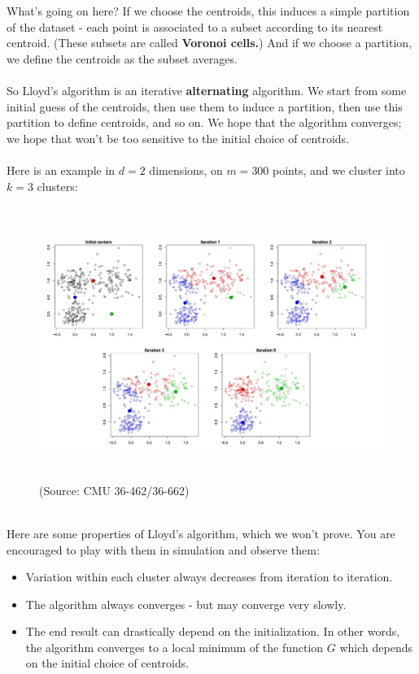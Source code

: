 What's going on here? 
If we choose the centroids, this induces a simple partition of the dataset -
each point is associated to a subset according to its nearest centroid. (These
  subsets are 
called {\bf Voronoi cells.}) And if we choose a partition, we define the
centroids as the subset averages. 
\\~\\
So Lloyd's algorithm is an iterative {\bf alternating} algorithm. 
We start from some initial
guess of the centroids, then use them to induce a partition, then use this
partition to define centroids, and so on. We hope that the algorithm converges;
we hope that won't be too sensitive to the initial choice of centroids.
\\~\\
Here is an example in  $d=2$ dimensions, on $m=300$ points, and we cluster into
$k=3$ clusters: 
\begin{figure}[H]
      \centering
      \includegraphics[height=3.5in]{kmeans.jpeg}        
      \caption{(Source: CMU 36-462/36-662)}
    \end{figure}
~\\ 
Here are some properties of Lloyd's algorithm, which we won't prove. You are
encouraged to play with them in simulation and observe them:
    \begin{itemize}
        \item Variation within each cluster always decreases from iteration to
          iteration.
        \item The algorithm always converges - but may converge very slowly.
        \item The end result can drastically depend on the initialization.
          In other words, the algorithm converges to a local minimum of the
          function $G$ which depends on the initial choice of centroids. 
        \end{itemize}

